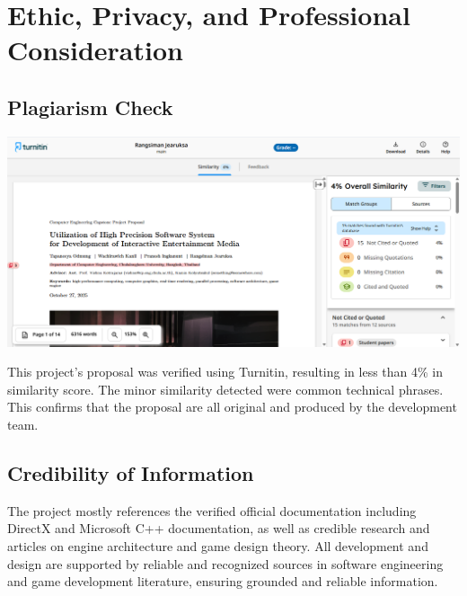\section{Ethic, Privacy, and Professional Consideration}
\label{sec:ethic-privacy-and-professional-consideration}

\subsection{Plagiarism Check}
\label{subsec:plagiarism-check}

\vspace{0.5cm}

\noindent
\begin{minipage}{\columnwidth}
    \centering
    \includegraphics[width=\columnwidth, keepaspectratio]{images/turnitin}
    \label{fig:plagiarism-check}
\end{minipage}

\vspace{0.5cm}

This project's proposal was verified using Turnitin, resulting in less than 4\% in similarity score.
The minor similarity detected were common technical phrases.
This confirms that the proposal are all original and produced by the development team.

\subsection{Credibility of Information}
\label{subsec:credibility-of-information}

The project mostly references the verified official documentation including DirectX and Microsoft C++ documentation,
as well as credible research and articles on engine architecture and game design theory.
All development and design are supported by reliable and recognized sources in software engineering and game development literature,
ensuring grounded and reliable information.

